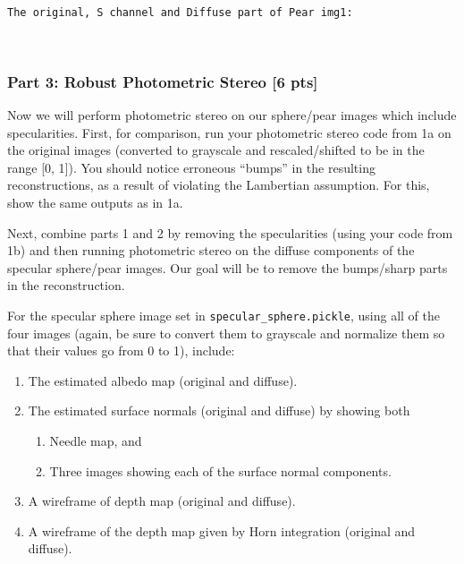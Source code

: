 \documentclass[11pt]{article}
\providecommand{\tightlist}{%
      \setlength{\itemsep}{0pt}\setlength{\parskip}{0pt}}
\begin{document}
    \begin{center}
    \end{center}
    { \hspace*{\fill} \\}
    
    \begin{Verbatim}[commandchars=\\\{\}]
The original, S channel and Diffuse part of Pear img1:
\end{Verbatim}

    \begin{center}
    \end{center}
    { \hspace*{\fill} \\}
    
    \hypertarget{part-3-robust-photometric-stereo-6-pts}{%
\subsubsection{Part 3: Robust Photometric Stereo {[}6
pts{]}}\label{part-3-robust-photometric-stereo-6-pts}}

Now we will perform photometric stereo on our sphere/pear images which
include specularities. First, for comparison, run your photometric
stereo code from 1a on the original images (converted to grayscale and
rescaled/shifted to be in the range {[}0, 1{]}). You should notice
erroneous ``bumps'' in the resulting reconstructions, as a result of
violating the Lambertian assumption. For this, show the same outputs as
in 1a.

Next, combine parts 1 and 2 by removing the specularities (using your
code from 1b) and then running photometric stereo on the diffuse
components of the specular sphere/pear images. Our goal will be to
remove the bumps/sharp parts in the reconstruction.

For the specular sphere image set in \texttt{specular\_sphere.pickle},
using all of the four images (again, be sure to convert them to
grayscale and normalize them so that their values go from 0 to 1),
include:

\begin{enumerate}
\def\labelenumi{\arabic{enumi}.}
\item
  The estimated albedo map (original and diffuse).
\item
  The estimated surface normals (original and diffuse) by showing both

  \begin{enumerate}
  \def\labelenumii{\arabic{enumii}.}
  \tightlist
  \item
    Needle map, and
  \item
    Three images showing each of the surface normal components.
  \end{enumerate}
\item
  A wireframe of depth map (original and diffuse).
\item
  A wireframe of the depth map given by Horn integration (original and
  diffuse).
\end{enumerate}
\end{document}
